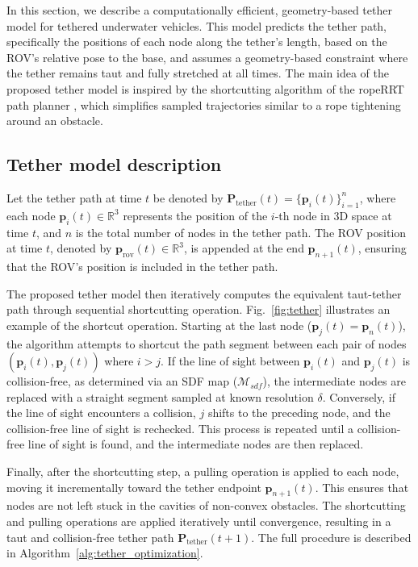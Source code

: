  In this section, we describe a computationally efficient, geometry-based tether model for tethered underwater vehicles. This model predicts the tether path, specifically the positions of each node along the tether's length, based on the \ac{ROV}'s relative pose to the base, and assumes a geometry-based constraint where the tether remains taut and fully stretched at all times. The main idea of the proposed tether model is inspired by the shortcutting algorithm of the ropeRRT path planner \cite{roperrt}, which simplifies sampled trajectories similar to a rope tightening around an obstacle. 


\subsection{Tether model description}
Let the tether path at time \( t \) be denoted by \( \mathbf{P}_{\mathrm{tether}}(t) = \{ \mathbf{p}_i(t) \}_{i=1}^{n} \), where each node \( \mathbf{p}_i(t) \in \mathbb{R}^3 \) represents the position of the \( i \)-th node in 3D space at time \( t \), and \( n \) is the total number of nodes in the tether path. The \ac{ROV} position at time \( t \), denoted by \( \mathbf{p}_{\mathrm{rov}}(t) \in \mathbb{R}^3 \), is appended at the end \( \mathbf{p}_{n+1}(t) \), ensuring that the \ac{ROV}'s position is included in the tether path. 

The proposed tether model then iteratively computes the equivalent taut-tether path through sequential shortcutting operation. Fig.~\ref{fig:tether} illustrates an example of the shortcut operation. Starting at the last node ($\mathbf{p}_j(t) = \mathbf{p}_{n}(t)$), the algorithm attempts to shortcut the path segment between each pair of nodes \( (\mathbf{p}_i(t), \mathbf{p}_j(t)) \) where \( i > j \).
If the line of sight between \( \mathbf{p}_i(t) \) and \( \mathbf{p}_j(t) \) is collision-free, as determined via an \ac{SDF} map (\( \mathcal{M}_{sdf} \)), the intermediate nodes are replaced with a straight segment sampled at known resolution \( \delta \). Conversely, if the line of sight encounters a collision, $j$ shifts to the preceding node, and the collision-free line of sight is rechecked. This process is repeated until a collision-free line of sight is found, and the intermediate nodes are then replaced. 

Finally, after the shortcutting step, a pulling operation is applied to each node, moving it incrementally toward the tether endpoint \( \mathbf{p}_{n+1}(t) \). This ensures that nodes are not left stuck in the cavities of non-convex obstacles. The shortcutting and pulling operations are applied iteratively until convergence, resulting in a taut and collision-free tether path \( \mathbf{P}_{\mathrm{tether}}(t+1) \). The full procedure is described in Algorithm~\ref{alg:tether_optimization}.







